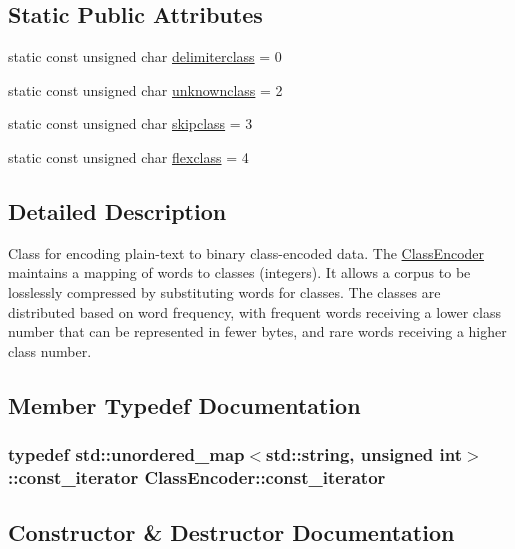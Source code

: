 \subsection*{Static Public Attributes}
\begin{DoxyCompactItemize}
\item 
static const unsigned char \hyperlink{classClassEncoder_a644f99132d9b6f5be6f645b40784b170}{delimiterclass} = 0
\item 
static const unsigned char \hyperlink{classClassEncoder_a4a99bcd37707a9d26707e45728ee7c1d}{unknownclass} = 2
\item 
static const unsigned char \hyperlink{classClassEncoder_a645b97d98a788a150f2458db90282276}{skipclass} = 3
\item 
static const unsigned char \hyperlink{classClassEncoder_a87e9e57927ca8c80c53612465aa8802d}{flexclass} = 4
\end{DoxyCompactItemize}


\subsection{Detailed Description}
Class for encoding plain-\/text to binary class-\/encoded data. The \hyperlink{classClassEncoder}{Class\+Encoder} maintains a mapping of words to classes (integers). It allows a corpus to be losslessly compressed by substituting words for classes. The classes are distributed based on word frequency, with frequent words receiving a lower class number that can be represented in fewer bytes, and rare words receiving a higher class number. 

\subsection{Member Typedef Documentation}
\hypertarget{classClassEncoder_afbc5a5bdbe889258e576f886a99e1427}{}
\subsubsection[{const\+\_\+iterator}]{\setlength{\rightskip}{0pt plus 5cm}typedef std\+::unordered\+\_\+map$<$std\+::string, unsigned int$>$\+::{\bf const\+\_\+iterator} {\bf Class\+Encoder\+::const\+\_\+iterator}}\label{classClassEncoder_afbc5a5bdbe889258e576f886a99e1427}


\subsection{Constructor \& Destructor Documentation}
\hypertarget{classClassEncoder_aacc3de280c20145195eb0218b6111c0a}{}
